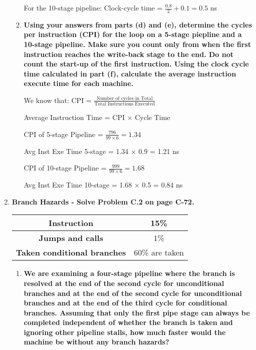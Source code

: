 \begin{enumerate}
\begin{enumerate}
        For the 10-stage pipeline:
        Clock-cycle time = $\frac{0.8}{2} + 0.1 = 0.5$ ns
        
        \item \textbf{Using your answers from parts (d) and (e), determine the cycles per instruction (CPI) for the loop on a 5-stage piepline and a 10-stage pipeline. Make sure you count only from when the first instruction reaches the write-back stage to the end. Do not count the start-up of the first instruction. Using the clock cycle time calculated in part (f), calculate the average instruction execute time for each machine.}
        
        We know that:
        CPI = $\frac{\text{Number of cycles in Total}}{\text{Total Instructions Executed}}$
        
        Average Instruction Time = CPI × Cycle Time
        
        CPI of 5-stage Pipeline = $\frac{796}{99 \times 6} = 1.34$
        
        Avg Inst Exe Time 5-stage = 1.34 × 0.9 = 1.21 ns
        
        CPI of 10-stage Pipeline = $\frac{999}{99 \times 6} = 1.68$
        
        Avg Inst Exe Time 10-stage = 1.68 × 0.5 = 0.84 ns
    \end{enumerate}
    
    \item \textbf{Branch Hazards - Solve Problem C.2 on page C-72.}
    \begin{center}
        \begin{tabular}{ |c|c| }
            \hline
            \textbf{Instruction} & 15\%\\
            \hline
            \textbf{Jumps and calls} & 1\% \\
            \hline
            \textbf{Taken conditional branches} & 60\% are taken \\
            \hline
        \end{tabular}
    \end{center}
    
    \begin{enumerate}
        \item \textbf{We are examining a four-stage pipeline where the branch is resolved at the end of the second cycle for unconditional branches and at the end of the second cycle for unconditional branches and at the end of the third cycle for conditional branches. Assuming that only the first pipe stage can always be completed independent of whether the branch is taken and ignoring other pipeline stalls, how much faster would the machine be without any branch hazards?}
        

\end{enumerate}
\end{enumerate}
